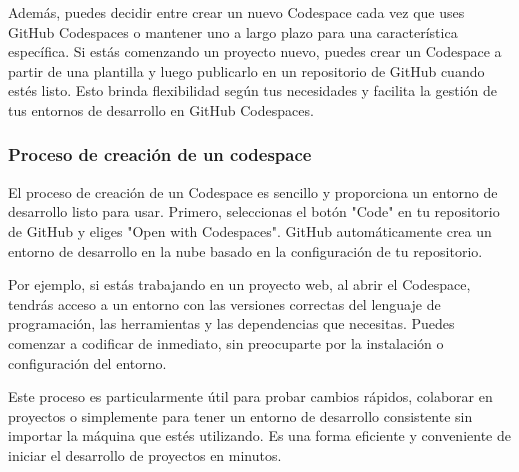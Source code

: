 Además, puedes decidir entre crear un nuevo Codespace cada vez que uses GitHub Codespaces o mantener uno a largo 
plazo para una característica específica. Si estás comenzando un proyecto nuevo, puedes crear un Codespace a partir 
de una plantilla y luego publicarlo en un repositorio de GitHub cuando estés listo. Esto brinda flexibilidad según 
tus necesidades y facilita la gestión de tus entornos de desarrollo en GitHub Codespaces.

\subsubsection*{Proceso de creación de un codespace}

El proceso de creación de un Codespace es sencillo y proporciona un entorno de desarrollo listo para usar. Primero, 
seleccionas el botón "Code" en tu repositorio de GitHub y eliges "Open with Codespaces". GitHub automáticamente crea 
un entorno de desarrollo en la nube basado en la configuración de tu repositorio.

Por ejemplo, si estás trabajando en un proyecto web, al abrir el Codespace, tendrás acceso a un entorno con las 
versiones correctas del lenguaje de programación, las herramientas y las dependencias que necesitas. Puedes comenzar 
a codificar de inmediato, sin preocuparte por la instalación o configuración del entorno.

Este proceso es particularmente útil para probar cambios rápidos, colaborar en proyectos o simplemente para tener 
un entorno de desarrollo consistente sin importar la máquina que estés utilizando. Es una forma eficiente y 
conveniente de iniciar el desarrollo de proyectos en minutos.

